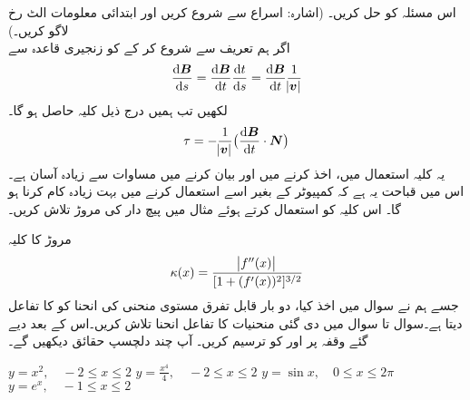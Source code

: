 اس مسئلہ کو حل کریں۔ (اشارہ:  اسراع  سے شروع کریں اور ابتدائی معلومات الٹ رخ لاگو کریں۔)
\\
اگر ہم تعریف   سے شروع کر کے  کو زنجیری قاعدہ سے
\begin{align*}
\frac{\dif\kvec{B}}{\dif s}=\frac{\dif\kvec{B}}{\dif t}\frac{\dif t}{\dif s}=\frac{\dif \kvec{B}}{\dif t}\frac{1}{\abs{\kvec{v}}}
\end{align*}
لکھیں تب ہمیں درج ذیل کلیہ حاصل ہو گا۔
\begin{align*}
\tau=-\frac{1}{\abs{\kvec{v}}}\big(\frac{\dif\kvec{B}}{\dif t}\cdot\kvec{N}\big)
\end{align*}
یہ کلیہ  استعمال میں، اخذ کرنے میں اور بیان کرنے میں  مساوات   سے زیادہ آسان ہے۔ اس میں قباحت  یہ ہے کہ کمپیوٹر کے بغیر  اسے استعمال کرنے میں بہت زیادہ کام کرنا ہو گا۔ اس کلیہ  کو استعمال کرتے ہوئے  مثال میں پیچ دار کی مروڑ تلاش کریں۔

مروڑ کا  کلیہ
\begin{align*}
\kappa(x)=\frac{\abs{f''(x)}}{[1+(f'(x))^2]^{3/2}}
\end{align*} 
جسے ہم نے سوال  میں اخذ کیا،  دو بار قابل تفرق مستوی منحنی  کی انحنا  کو  کا تفاعل دیتا ہے۔سوال  تا سوال  میں دی گئی منحنیات کا تفاعل انحنا تلاش کریں۔اس کے بعد دیے گئے وقفہ پر  اور  کو ترسیم کریں۔ آپ چند دلچسپ حقائق دیکھیں گے۔

$y=x^2,\quad -2\le x\le 2$
$y=\tfrac{x^4}{4},\quad -2\le x\le 2$
$y=\sin x,\quad 0\le x\le 2\pi$
$y=e^x,\quad -1\le x\le 2$

